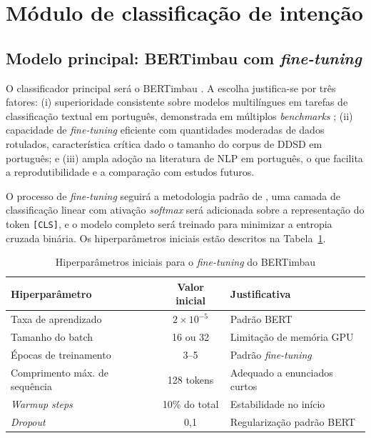 \documentclass[
    12pt,                %
    openright,           %
    oneside,             %
    a4paper,             %
    english,             %
    brazil               %
]{abntex2}
\begin{document}
\section{Módulo de classificação de intenção}
\label{sec:modulo_classificador}

\subsection{Modelo principal: BERTimbau com \textit{fine-tuning}}
\label{sec:bertimbau_finetune}

O classificador principal será o BERTimbau \cite{Souza2020}. A escolha justifica-se por três fatores: (i) superioridade consistente sobre modelos multilíngues em tarefas de classificação textual em português, demonstrada em múltiplos \textit{benchmarks} \cite{Souza2020}; (ii) capacidade de \textit{fine-tuning} eficiente com quantidades moderadas de dados rotulados, característica crítica dado o tamanho do corpus de DDSD em português; e (iii) ampla adoção na literatura de NLP em português, o que facilita a reprodutibilidade e a comparação com estudos futuros.

O processo de \textit{fine-tuning} seguirá a metodologia padrão de , uma camada de classificação linear com ativação \textit{softmax} será adicionada sobre a representação do token \texttt{[CLS]}, e o modelo completo será treinado para minimizar a entropia cruzada binária. Os hiperparâmetros iniciais estão descritos na Tabela~\ref{tab:hiperparametros}.

\begin{table}[htb]
    \centering
    \caption{Hiperparâmetros iniciais para o \textit{fine-tuning} do BERTimbau}
    \label{tab:hiperparametros}
    \begin{tabular}{lcl}
        \toprule
        \textbf{Hiperparâmetro}
            & \textbf{Valor inicial}
            & \textbf{Justificativa} \\
        \midrule
        Taxa de aprendizado
            & $2 \times 10^{-5}$
            & Padrão BERT \cite{Devlin2019} \\
        Tamanho do batch
            & 16 ou 32
            & Limitação de memória GPU \\
        Épocas de treinamento
            & 3--5
            & Padrão \textit{fine-tuning} \cite{Devlin2019} \\
        Comprimento máx. de sequência
            & 128 tokens
            & Adequado a enunciados curtos \\
        \textit{Warmup steps}
            & 10\% do total
            & Estabilidade no início \\
        \textit{Dropout}
            & 0,1
            & Regularização padrão BERT \\
        \bottomrule
    \end{tabular}
\end{table}
\end{document}

